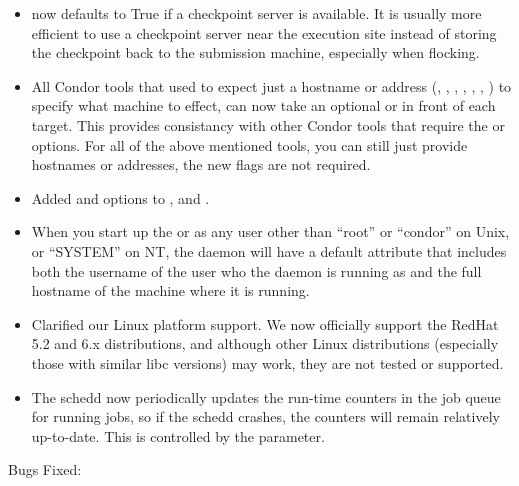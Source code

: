 \begin{itemize}
\item {} now defaults to True if a checkpoint
server is available.  It is usually more efficient to use a checkpoint
server near the execution site instead of storing the checkpoint back
to the submission machine, especially when flocking.

\item All Condor tools that used to expect just a hostname or address 
(, , , ,
, , ) to specify
what machine to effect, can now take an optional  or
 in front of each target.
This provides consistancy with other Condor tools that require the
 or  options.
For all of the above mentioned tools, you can still just provide
hostnames or addresses, the new flags are not required.

\item Added  and  options to ,
 and .

\item When you start up the  or  as any
user other than ``root'' or ``condor'' on Unix, or ``SYSTEM'' on NT,
the daemon will have a default  attribute that includes
both the username of the user who the daemon is running as and the
full hostname of the machine where it is running.

\item Clarified our Linux platform support.  We now officially
support the RedHat 5.2 and 6.x distributions, and although other Linux
distributions (especially those with similar libc versions) may work,
they are not tested or supported.

\item The schedd now periodically updates the run-time counters in the
job queue for running jobs, so if the schedd crashes, the counters
will remain relatively up-to-date.  This is controlled by the
 parameter.

\end{itemize}

\noindent Bugs Fixed:

